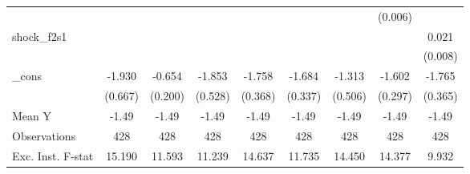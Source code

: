 {\begin{tabular}{l*{8}{c}}
            &                     &                     &                     &                     &                     &                     &     (0.006)         &                     \\
\addlinespace
shock\_f2s1  &                     &                     &                     &                     &                     &                     &                     &       0.021\sym{**} \\
            &                     &                     &                     &                     &                     &                     &                     &     (0.008)         \\
\addlinespace
\_cons      &      -1.930\sym{***}&      -0.654\sym{***}&      -1.853\sym{***}&      -1.758\sym{***}&      -1.684\sym{***}&      -1.313\sym{**} &      -1.602\sym{***}&      -1.765\sym{***}\\
            &     (0.667)         &     (0.200)         &     (0.528)         &     (0.368)         &     (0.337)         &     (0.506)         &     (0.297)         &     (0.365)         \\
\midrule
Mean Y      &       -1.49         &       -1.49         &       -1.49         &       -1.49         &       -1.49         &       -1.49         &       -1.49         &       -1.49         \\
Observations&         428         &         428         &         428         &         428         &         428         &         428         &         428         &         428         \\
Exc. Inst. F-stat&      15.190         &      11.593         &      11.239         &      14.637         &      11.735         &      14.450         &      14.377         &       9.932         \\
\bottomrule
\end{tabular}
}
